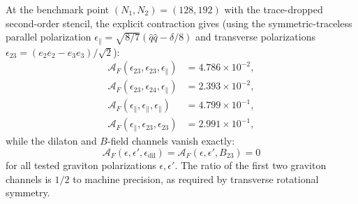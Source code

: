 \documentclass[11pt]{article}
\begin{document}
At the benchmark point $(N_1, N_2) = (128, 192)$ with the trace-dropped second-order stencil, the explicit contraction gives (using the symmetric-traceless parallel polarization $\epsilon_\parallel = \sqrt{8/7}(\hat q\hat q - \delta/8)$ and transverse polarizations $\epsilon_{23} = (e_2 e_2 - e_3 e_3)/\sqrt{2}$):
\begin{equation}
\begin{aligned}
\mathcal{A}_F(\epsilon_{23}, \epsilon_{23}, \epsilon_\parallel) &= 4.786 \times 10^{-2}, \\
\mathcal{A}_F(\epsilon_{23}, \epsilon_{24}, \epsilon_\parallel) &= 2.393 \times 10^{-2}, \\
\mathcal{A}_F(\epsilon_\parallel, \epsilon_\parallel, \epsilon_\parallel) &= 4.799 \times 10^{-1}, \\
\mathcal{A}_F(\epsilon_\parallel, \epsilon_{23}, \epsilon_{23}) &= 2.991 \times 10^{-1},
\end{aligned}
\label{eq:ferm-channels}
\end{equation}
while the dilaton and $B$-field channels vanish exactly:
\begin{equation}
\mathcal{A}_F(\epsilon, \epsilon', \epsilon_{\mathrm{dil}}) = \mathcal{A}_F(\epsilon, \epsilon', B_{23}) = 0
\label{eq:ferm-zeros}
\end{equation}
for all tested graviton polarizations $\epsilon, \epsilon'$. The ratio of the first two graviton channels is $1/2$ to machine precision, as required by transverse rotational symmetry.
\end{document}
